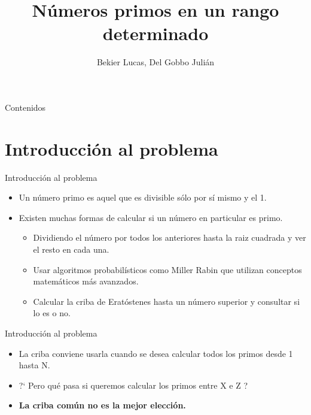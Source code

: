 \documentclass[compress]{beamer}
\title[Programación Paralela Basada en Patrones] %
{Números primos en un rango determinado}
\author[Bekier Lucas, Del Gobbo Julián] %
{Bekier Lucas, Del Gobbo Julián}
\institute[UBA FCEN] %
{
  Facultad de Ciencias Exactas y Naturales\\
  Universidad de Buenos Aires
}
\begin{document}
\begin{frame}
  \titlepage
\end{frame}

\begin{frame}{Contenidos}
  \tableofcontents
\end{frame}



\section{Introducci\'on al problema}

\begin{frame}{Introducci\'on al problema}

  \begin{itemize}
    \setlength\itemsep{1em}
    \item<1-> Un número primo es aquel que es divisible sólo por sí mismo y el 1.
    \item<2-> Existen muchas formas de calcular si un número en particular es primo.
  	\begin{itemize}
  	\setlength\itemsep{1em}
  		\item<3-> Dividiendo el número por todos los anteriores hasta la raiz cuadrada y ver el resto en cada una.
      \item<4-> Usar algoritmos probabilísticos como Miller Rabin que utilizan conceptos matemáticos más avanzados.
      \item<5-> Calcular la criba de Eratóstenes hasta un número superior y consultar si lo es o no.
  	\end{itemize} 
  \end{itemize}
\end{frame}


\begin{frame}{Introducci\'on al problema}
  \begin{itemize}
    \setlength\itemsep{1em}
    \item<1-> La criba conviene usarla cuando se desea calcular todos los primos desde 1 hasta N.
    \item<2-> ?` Pero qué pasa si queremos calcular los primos entre X e Z ?
    \item<3-> \textbf{La criba común no es la mejor elección.}
  \end{itemize}
\end{frame}
\end{document}
